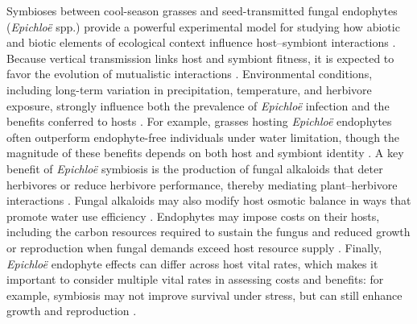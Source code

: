\documentclass[12pt]{article}\usepackage[]{graphicx}\usepackage[dvipsnames]{xcolor}
\newcommand{\tom}[2]{{\color{red}{#1}}\footnote{\textit{\color{red}{#2}}}}
\begin{document}
Symbioses between cool-season grasses and seed-transmitted fungal endophytes (\textit{Epichloë} spp.) provide a powerful experimental model for studying how abiotic and biotic elements of ecological context influence host–symbiont interactions \citep{schardl2004symbioses,saikkonen2010defensive,oberhofer2014effects,clay2005herbivores}. 
Because vertical transmission links host and symbiont fitness, it is expected to favor the evolution of mutualistic interactions \citep{gundel2024temporal,gundel2011incorporating}. 
Environmental conditions, including long-term variation in precipitation, temperature, and herbivore exposure, strongly influence both the prevalence of \textit{Epichloë} infection and the benefits conferred to hosts \citep{clay2005herbivores,rudgers2016long,fowler2025increasing}. 
For example, grasses hosting \textit{Epichloë} endophytes often outperform endophyte-free individuals under water limitation, though the magnitude of these benefits depends on both host and symbiont identity \citep{decunta2021systematic}. 
A key benefit of \textit{Epichloë} symbiosis is the production of fungal alkaloids that deter herbivores or reduce herbivore performance, thereby mediating plant–herbivore interactions \citep{saikkonen2010defensive,crawford2010fungal}.
Fungal alkaloids may also modify host osmotic balance in ways that promote water use efficiency \citep{decunta2021systematic}. 
Endophytes may impose costs on their hosts, including the carbon resources required to sustain the fungus and reduced growth or reproduction when fungal demands exceed host resource supply \citep{bennett2022costs}. 
Finally, \textit{Epichloë} endophyte effects can differ across host vital rates, which makes it important to consider multiple vital rates in assessing costs and benefits: for example, symbiosis may not improve survival under stress, but can still enhance growth and reproduction \citep{yule2013costs,rudgers2012there}. 
\end{document}
